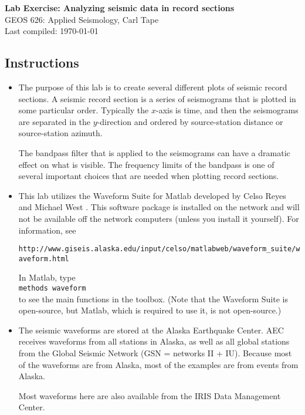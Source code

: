 \documentclass[11pt,titlepage,fleqn]{article}
\begin{document}

\begin{spacing}{1.2}
\centering
{\large \bf Lab Exercise: Analyzing seismic data in record sections} \\
GEOS 626: Applied Seismology, Carl Tape \\
Last compiled: \today
\end{spacing}


\subsection*{Instructions}

\begin{itemize}
\item The purpose of this lab is to create several different plots of seismic record sections. A seismic record section is a series of seismograms that is plotted in some particular order. Typically the $x$-axis is time, and then the seismograms are separated in the $y$-direction and ordered by source-station distance or source-station azimuth.

The bandpass filter that is applied to the seismograms can have a dramatic effect on what is visible. The frequency limits of the bandpass is one of several important choices that are needed when plotting record sections.

\item This lab utilizes the Waveform Suite for Matlab developed by Celso Reyes and Michael West \citep{ReyesWest2011}. This software package is installed on the network and will not be available off the network computers (unless you install it yourself). For information, see

\verb+http://www.giseis.alaska.edu/input/celso/matlabweb/waveform_suite/waveform.html+

In Matlab, type \\
\verb+methods waveform+ \\
to see the main functions in the toolbox.
(Note that the Waveform Suite is open-source, but Matlab, which is required to use it, is not open-source.)

\item The seismic waveforms are stored at the Alaska Earthquake Center. AEC receives waveforms from all stations in Alaska, as well as all global stations from the Global Seismic Network (GSN = networks II + IU). Because most of the waveforms are from Alaska, most of the examples are from events from Alaska.

Most waveforms here are also available from the IRIS Data Management Center.


\end{itemize}
\end{document}
